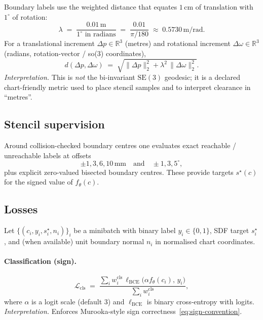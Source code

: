 \documentclass[11pt,a4paper]{article}
\newcommand{\SE}{\mathrm{SE}}
\newcommand{\R}{\mathbb{R}}
\begin{document}
Boundary labels use the weighted distance that equates \(1\,\mathrm{cm}\) of
translation with \(1^{\circ}\) of rotation:
\begin{equation}
\label{eq:lambda-metric}
  \lambda
  \;=\;
  \frac{0.01\,\mathrm{m}}{1^{\circ}\text{ in radians}}
  \;=\;
  \frac{0.01}{\pi/180}
  \;\approx\;
  0.5730\,\mathrm{m/rad}.
\end{equation}
For a translational increment \(\Delta p\in\R^{3}\) (metres) and rotational
increment \(\Delta\omega\in\R^{3}\) (radians, rotation-vector / so(3) coordinates),
\begin{equation}
\label{eq:se3-distance}
  d(\Delta p,\Delta\omega)
  \;=\;
  \sqrt{
    \|\Delta p\|_{2}^{2}
    +
    \lambda^{2}\,\|\Delta\omega\|_{2}^{2}
  }.
\end{equation}
\emph{Interpretation.}
This is \emph{not} the bi-invariant \(\SE(3)\) geodesic; it is a declared
chart-friendly metric used to place stencil samples and to interpret
clearance in ``metres''.

\subsection{Stencil supervision}
\label{sec:stencil}

Around collision-checked boundary centres one evaluates exact reachable /
unreachable labels at offsets
\begin{equation}
\label{eq:stencil-offsets}
  \pm 1,3,6,10\,\mathrm{mm}
  \quad\text{and}\quad
  \pm 1,3,5^{\circ},
\end{equation}
plus explicit zero-valued bisected boundary centres. These provide targets
\(s^{\star}(c)\) for the signed value of \(f_{\theta}(c)\).

\subsection{Losses}
\label{sec:losses}

Let \(\{(c_{i},y_{i},s_{i}^{\star},n_{i})\}_{i}\) be a minibatch with binary
label \(y_{i}\in\{0,1\}\), SDF target \(s_{i}^{\star}\), and (when available)
unit boundary normal \(n_{i}\) in normalised chart coordinates.

\paragraph{Classification (sign).}
\begin{equation}
\label{eq:loss-cls}
  \mathcal{L}_{\mathrm{cls}}
  \;=\;
  \frac{
    \sum_{i} w_{i}^{\mathrm{cls}}\,
    \ell_{\mathrm{BCE}}\bigl(\alpha f_{\theta}(c_{i}),\, y_{i}\bigr)
  }{
    \sum_{i} w_{i}^{\mathrm{cls}}
  },
\end{equation}
where \(\alpha\) is a logit scale (default \(3\)) and
\(\ell_{\mathrm{BCE}}\) is binary cross-entropy with logits.
\emph{Interpretation.}
Enforces Murooka-style sign correctness~\eqref{eq:sign-convention}.
\end{document}
